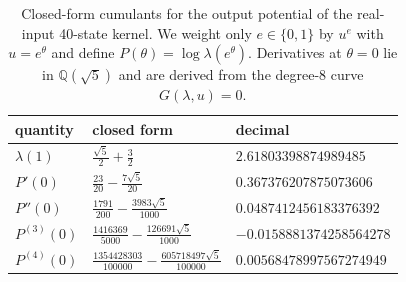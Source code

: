 \begin{table}[H]
\centering
\scriptsize
\setlength{\tabcolsep}{6pt}
\caption{Closed-form cumulants for the output potential of the real-input 40-state kernel. We weight only $e\in\{0,1\}$ by $u^e$ with $u=e^{\theta}$ and define $P(\theta)=\log\lambda(e^{\theta})$. Derivatives at $\theta=0$ lie in $\mathbb{Q}(\sqrt5)$ and are derived from the degree-8 curve $G(\lambda,u)=0$.}
\label{tab:real_input_40_output_potential_cumulants_closed}
\begin{tabular}{l l l}
\toprule
quantity & closed form & decimal \\
\midrule
$\lambda(1)$ & $\frac{\sqrt{5}}{2} + \frac{3}{2}$ & $2.61803398874989485$\\
$P'(0)$ & $\frac{23}{20} - \frac{7 \sqrt{5}}{20}$ & $0.367376207875073606$\\
$P''(0)$ & $\frac{1791}{200} - \frac{3983 \sqrt{5}}{1000}$ & $0.0487412456183376392$\\
$P^{(3)}(0)$ & $\frac{1416369}{5000} - \frac{126691 \sqrt{5}}{1000}$ & $-0.0158881374258564278$\\
$P^{(4)}(0)$ & $\frac{1354428303}{100000} - \frac{605718497 \sqrt{5}}{100000}$ & $0.00568478997567274949$\\
\bottomrule
\end{tabular}
\end{table}
